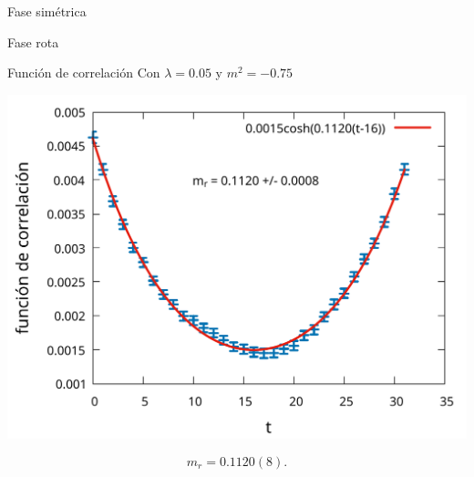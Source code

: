 \documentclass[11pt]{beamer}
\begin{document}
\begin{frame}{Fase simétrica}
\end{frame}

\begin{frame}{Fase rota}
\end{frame}

\begin{frame}{Función de correlación}
Con $\lambda = 0.05$ y $m^2 = -0.75$ 
\begin{center}
\includegraphics[scale=0.3]{figures/correlation_function.pdf}
\end{center}

$$ m_r = 0.1120(8). $$
\end{frame}
\end{document}
